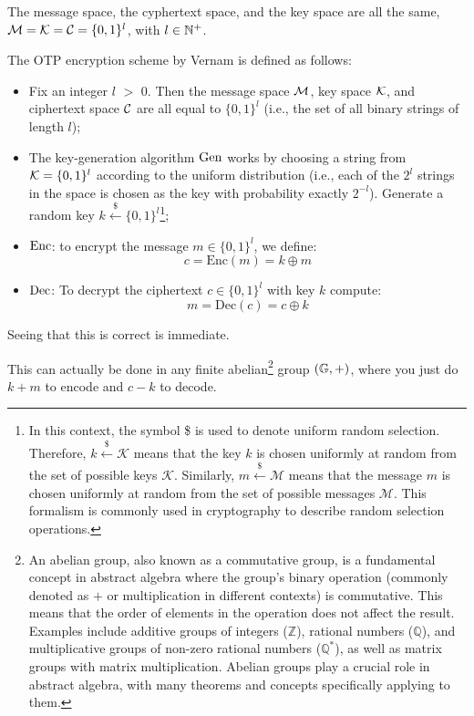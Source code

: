 \begin{tcolorbox}[colframe=black, colback=sfondo_gray, sharp corners]

\begin{construction}
	The message space, the cyphertext space, and the key space are all the same, \ie $\mathcal{M} = \mathcal{K} = \mathcal{C} = \{0,1\}^{l}$, with $l \in \mathbb{N}^{+}$.

	The \acl{OTP} encryption scheme by Vernam is defined as follows:
	
	\begin{itemize}
		\item Fix an integer $l$ $>$ 0. Then the message space $\mathcal{M}$, key space $\mathcal{K}$, and ciphertext space $\mathcal{C}$ are all equal to $\{0, 1\}^l$ (i.e., the set of all binary strings of length $l$);
		\item The key-generation algorithm $\mathrm{Gen}$ works by choosing a string from $\mathcal{K} = \{0, 1\}^l$ according to the uniform distribution (i.e., each of the $2^l$ strings in the space is chosen as the key with probability exactly $2^{-l}$). Generate a random key $k \overset{\$}{\leftarrow} \{0,1\}^l$\footnote{In this context, the symbol \$ is used to denote uniform random selection. Therefore, \( k \overset{\$}{\leftarrow} \mathcal{K} \) means that the key \( k \) is chosen uniformly at random from the set of possible keys \( \mathcal{K} \). Similarly, \( m \overset{\$}{\leftarrow} \mathcal{M} \) means that the message \( m \) is chosen uniformly at random from the set of possible messages \( \mathcal{M} \). This formalism is commonly used in cryptography to describe random selection operations.
		};
		\item $\mathrm{Enc}$: to encrypt the message \( m \in \{0, 1\}^l \), we define:
		\begin{equation*}
			c = \text{Enc}(m) = k \oplus m
		\end{equation*}
		\item $\mathrm{Dec}$: To decrypt the ciphertext $c \in \{0, 1\}^l$ with key $k$ compute:
		\begin{equation*}
			m = \text{Dec}(c) = c \oplus k
		\end{equation*}
	\end{itemize}
\end{construction}
\end{tcolorbox}
Seeing that this is correct is immediate.

This can actually be done in any finite abelian\footnote{An abelian group, also known as a commutative group, is a fundamental concept in abstract algebra where the group's binary operation (commonly denoted as \(+\) or multiplication in different contexts) is commutative. This means that the order of elements in the operation does not affect the result. Examples include additive groups of integers (\(\mathbb{Z}\)), rational numbers (\(\mathbb{Q}\)), and multiplicative groups of non-zero rational numbers (\(\mathbb{Q}^*\)), as well as matrix groups with matrix multiplication. Abelian groups play a crucial role in abstract algebra, with many theorems and concepts specifically applying to them.
} group $(\mathbb{G}, +)$, where you just do $k + m$ to encode and $c - k$ to decode.


